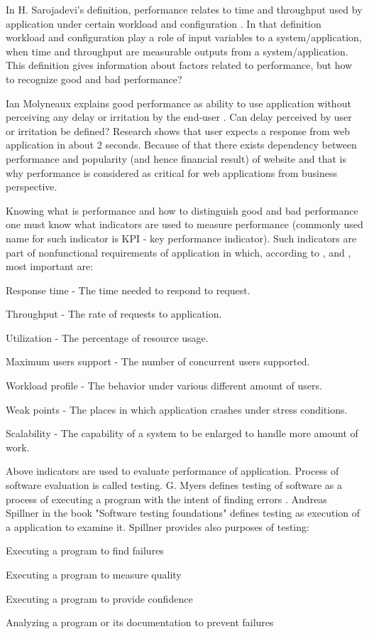 \documentclass[10pt,a4paper]{article}
\let\tempone\itemize
\let\temptwo\enditemize
\renewenvironment{itemize}{\tempone\addtolength{\itemsep}{-0.4\baselineskip}}{\temptwo}
\let\tempone\enumerate
\let\temptwo\endenumerate
\begin{document}
In H. Sarojadevi's definition, performance relates to time and throughput used by application under certain workload and configuration \cite{petmethodsandtools}. In that definition workload and configuration play a role of input variables to a system/application, when time and throughput are measurable outputs from a system/application. This definition gives information about factors related to performance, but how to recognize good and bad performance?

Ian Molyneaux explains good performance as ability to use application without perceiving any delay or irritation by the end-user \cite{artperformance}. Can delay perceived by user or irritation be defined? Research \cite{howlong} shows that user expects a response from web application in about 2 seconds. Because of that there exists dependency between performance and popularity (and hence financial result) of website and that is why performance is  considered as critical for web applications from business perspective\cite{architectingperformance}. 

Knowing what is performance and how to distinguish good and bad performance one must know what indicators are used to measure performance (commonly used name for such indicator is KPI - key performance indicator). Such indicators are part of nonfunctional requirements of application in which, according to \cite{artperformance}, \cite{analysisofpet} and \cite{petmethodsandtools},  most important are:  
\begin{itemize}
\item Response time - The time needed to respond to request.
\item Throughput - The rate of requests to application.
\item Utilization - The percentage of resource usage.
\item Maximum users support - The number of concurrent users supported.
\item Workload profile - The behavior under various different amount of users.
\item Weak points - The places in which application crashes under stress conditions.
\item Scalability - The capability of a system to be enlarged to handle more amount of work.
\end{itemize}

Above indicators are used to evaluate performance of application. Process of software evaluation is called testing. G. Myers defines testing of software as a process of executing a program with the intent of finding errors \cite{arttest}. Andreas Spillner in the book "Software testing foundations" \cite{testfoundations} defines testing as execution of a application to examine it. Spillner provides also purposes of testing: 
\begin{itemize}
\item Executing a program to find failures
\item Executing a program to measure quality
\item Executing a program to provide confidence 
\item Analyzing a program or its documentation to prevent failures
\end{itemize}
\end{document}
